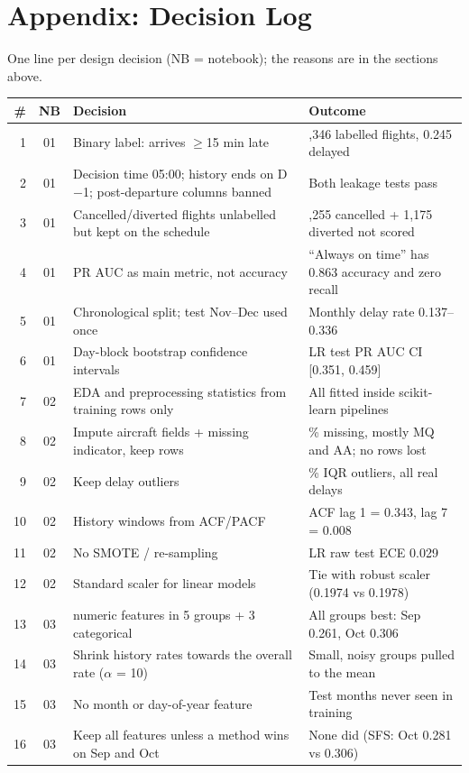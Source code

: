 \documentclass[conference]{IEEEtran}
\begin{document}
\section*{Appendix: Decision Log}
One line per design decision (NB = notebook); the reasons are in the sections above.
\footnotesize
\begin{longtable}{@{}r c >{\raggedright\arraybackslash}p{3.0in} >{\raggedright\arraybackslash}p{3.2in}@{}}
\toprule
\# & NB & Decision & Outcome\\\midrule\endhead
1 & 01 & Binary label: arrives $\geq$15 min late & 327,346 labelled flights, 0.245 delayed\\
2 & 01 & Decision time 05:00; history ends on D$-$1; post-departure columns banned & Both leakage tests pass\\
3 & 01 & Cancelled/diverted flights unlabelled but kept on the schedule & 8,255 cancelled + 1,175 diverted not scored\\
4 & 01 & PR AUC as main metric, not accuracy & ``Always on time'' has 0.863 accuracy and zero recall\\
5 & 01 & Chronological split; test Nov--Dec used once & Monthly delay rate 0.137--0.336\\
6 & 01 & Day-block bootstrap confidence intervals & LR test PR AUC CI [0.351, 0.459]\\
7 & 02 & EDA and preprocessing statistics from training rows only & All fitted inside scikit-learn pipelines\\
8 & 02 & Impute aircraft fields + missing indicator, keep rows & 17.47\% missing, mostly MQ and AA; no rows lost\\
9 & 02 & Keep delay outliers & 9.1\% IQR outliers, all real delays\\
10 & 02 & History windows from ACF/PACF & ACF lag 1 = 0.343, lag 7 = 0.008\\
11 & 02 & No SMOTE / re-sampling & LR raw test ECE 0.029\\
12 & 02 & Standard scaler for linear models & Tie with robust scaler (0.1974 vs 0.1978)\\
13 & 03 & 41 numeric features in 5 groups + 3 categorical & All groups best: Sep 0.261, Oct 0.306\\
14 & 03 & Shrink history rates towards the overall rate ($\alpha$ = 10) & Small, noisy groups pulled to the mean\\
15 & 03 & No month or day-of-year feature & Test months never seen in training\\
16 & 03 & Keep all features unless a method wins on Sep and Oct & None did (SFS: Oct 0.281 vs 0.306)\\

\end{longtable}
\end{document}
